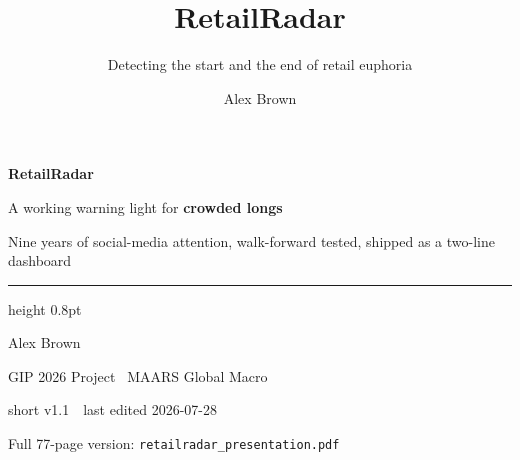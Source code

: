\documentclass[aspectratio=169,11pt]{beamer}
\title{RetailRadar}
\subtitle{Detecting the start and the end of retail euphoria}
\author{Alex Brown}
\institute{GIP 2026 Project \textbullet\ MAARS Global Macro}
\date{\lastedited}
\newcommand{\lastedited}{2026-07-28}
\newcommand{\deckversion}{short v1.1}
\begin{document}
\begin{frame}[plain]
  \vspace{1.2em}
  {\color{gicnavy}\fontsize{30}{34}\selectfont\bfseries RetailRadar\par}
  \vspace{0.4em}
  {\color{gicink}\large A working warning light for \textbf{crowded longs}\par}
  \vspace{0.3em}
  {\color{gicgrey}\normalsize Nine years of social-media attention, walk-forward
   tested, shipped as a two-line dashboard\par}
  \vspace{1.1em}
  {\color{gicrule}\hrule height 0.8pt}
  \vspace{0.8em}
  {\color{gicink}\normalsize Alex Brown\par}
  {\color{gicgrey}\small GIP 2026 Project \textbullet\ MAARS Global Macro\par}
  \vspace{1.0em}
  {\color{giclight}\scriptsize \deckversion\ \textbullet\ last edited
   \lastedited\par}
  \vspace{0.4em}
  {\color{giclight}\scriptsize Full 77-page version:
   \texttt{retailradar\_presentation.pdf}\par}
\end{frame}
\end{document}
